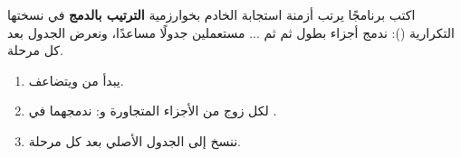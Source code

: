 \begin{statement}
اكتب برنامجًا يرتب أزمنة استجابة الخادم بخوارزمية \textbf{الترتيب بالدمج} في نسختها التكرارية (): ندمج أجزاء بطول  ثم  ثم  ... مستعملين جدولًا مساعدًا، ونعرض الجدول بعد كل مرحلة.
\end{statement}
\begin{stepsbox}\begin{enumerate}
\item {} يبدأ من  ويتضاعف.
\item لكل زوج من الأجزاء المتجاورة \code{[left, mid)} و\code{[mid, right)}: ندمجهما في .
\item ننسخ  إلى الجدول الأصلي بعد كل مرحلة.
\end{enumerate}\end{stepsbox}

